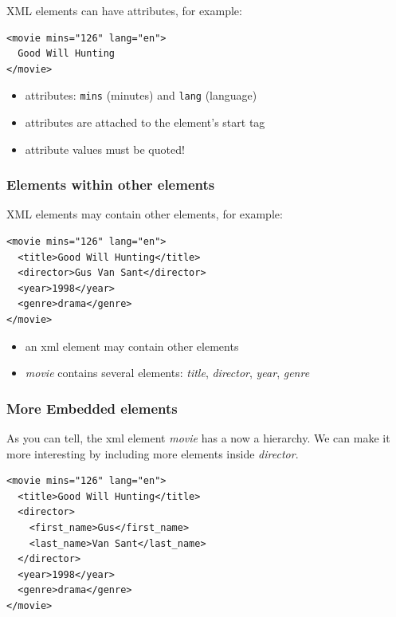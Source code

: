 \documentclass[
]{book}
\providecommand{\tightlist}{%
  \setlength{\itemsep}{0pt}\setlength{\parskip}{0pt}}
\begin{document}
XML elements can have attributes, for example:

\begin{verbatim}
<movie mins="126" lang="en">
  Good Will Hunting
</movie>
\end{verbatim}

\begin{itemize}
\tightlist
\item
  attributes: \texttt{mins} (minutes) and \texttt{lang} (language)
\item
  attributes are attached to the element's start tag
\item
  attribute values must be quoted!
\end{itemize}

\hypertarget{elements-within-other-elements}{%
\subsubsection*{Elements within other elements}\label{elements-within-other-elements}}

XML elements may contain other elements, for example:

\begin{verbatim}
<movie mins="126" lang="en">
  <title>Good Will Hunting</title>
  <director>Gus Van Sant</director>
  <year>1998</year>
  <genre>drama</genre>
</movie>
\end{verbatim}

\begin{itemize}
\item
  an xml element may contain other elements
\item
  \emph{movie} contains several elements: \emph{title}, \emph{director}, \emph{year}, \emph{genre}
\end{itemize}

\hypertarget{more-embedded-elements}{%
\subsubsection*{More Embedded elements}\label{more-embedded-elements}}

As you can tell, the xml element \emph{movie} has a now a hierarchy. We can make it
more interesting by including more elements inside \emph{director}.

\begin{verbatim}
<movie mins="126" lang="en">
  <title>Good Will Hunting</title>
  <director>
    <first_name>Gus</first_name>
    <last_name>Van Sant</last_name>
  </director>
  <year>1998</year>
  <genre>drama</genre>
</movie>
\end{verbatim}
\end{document}
